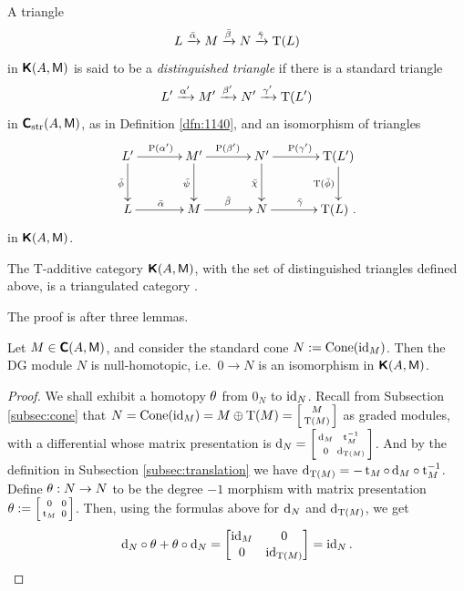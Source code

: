 \begin{dfn} \label{dfn:140}
A triangle 
\[ L \xrightarrow{\bar{\alpha}} M \xrightarrow{\bar{\beta}} N \xrightarrow{\bar{\gamma}} \operatorname{T}(L)  \]
in $\boldsymbol{\mathsf{K}}(A, \operatorname{\mathsf{M}})$ is said to be a {\em distinguished triangle}
if there is a standard triangle 
\[ L' \xrightarrow{\alpha'} M' \xrightarrow{\beta'} N' \xrightarrow{\gamma'} \operatorname{T}(L')  \]
in $\boldsymbol{\mathsf{C}}_{\mathrm{str}}(A, \operatorname{\mathsf{M}})$, as in Definition \ref{dfn:1140},
and an isomorphism of triangles 
\[ \UseTips  \xymatrix @C=8ex @R=6ex { 
L' 
\ar[r]^{\opn{P}(\al')}
\ar[d]_{ \bar{\phi} } 
&
M'
\ar[r]^{\opn{P}(\be')}
\ar[d]_{ \bar{\psi} }
& 
N'
\ar[r]^{\opn{P}(\ga')}
\ar[d]_{ \bar{\chi} }
&
\opn{T}(L')
\ar[d]_{ \opn{T}(\bar{\phi}) }
\\
L 
\ar[r]^{\bar{\al}}
&
M
\ar[r]^{\bar{\be}}
& 
N
\ar[r]^{\bar{\ga}}
&
\opn{T}(L)
\ .
}  \]
in $\boldsymbol{\mathsf{K}}(A, \operatorname{\mathsf{M}})$.
\end{dfn}

\begin{thm} \label{thm:1255}
The T-additive category $\boldsymbol{\mathsf{K}}(A, \operatorname{\mathsf{M}})$, with the set of 
distinguished triangles defined above, is a triangulated category%
%
.
\end{thm}

The proof is after three lemmas. 

\begin{lem}  \label{lem:2}
Let $M \in \boldsymbol{\mathsf{C}}(A, \operatorname{\mathsf{M}})$, and consider the standard cone 
$N := \operatorname{Cone}(\operatorname{id}_M)$. Then the DG module $N$ is null-homotopic, i.e.\ 
$0 \to N$ is an isomorphism in $\boldsymbol{\mathsf{K}}(A, \operatorname{\mathsf{M}})$.
\end{lem}

\begin{proof}
We shall exhibit a homotopy $\theta$ from $0_N$ to $\operatorname{id}_N$. 
Recall from Subsection \ref{subsec:cone} that 
$N = \operatorname{Cone}(\operatorname{id}_M) = M \oplus \operatorname{T}(M) = 
\left[ \begin{smallmatrix}  M \\[0.2em]\operatorname{T}(M)  \end{smallmatrix} \right]$
as graded modules, with a differential whose matrix presentation is
$\mathrm{d}_{N} = \left[ \begin{smallmatrix} \mathrm{d}_M & \operatorname{t}_M^{-1} \\[0.2em] 0 & \mathrm{d}_{\operatorname{T}(M)} \end{smallmatrix} \right]$.
And by the definition in Subsection \ref{subsec:translation} we have
$\mathrm{d}_{\operatorname{T}(M)} = - \operatorname{t}_M \circ \, \mathrm{d}_M \circ \operatorname{t}_M^{-1}$. 
Define 
$\theta : N \to N$ to be the degree $-1$ morphism with  matrix presentation
$\theta :=  \left[ \begin{smallmatrix}  0 & \, 0 \\[0.2em] \operatorname{t}_M & \, 0  \end{smallmatrix} \right]$.
Then, using the formulas above for $\mathrm{d}_N$ and $\mathrm{d}_{\operatorname{T}(M)}$, we get
\[ \mathrm{d}_N \circ \theta + \theta \circ \mathrm{d}_N =  
\begin{bmatrix}  \operatorname{id}_M & 0 \\[0.1em] 0 & \operatorname{id}_{\operatorname{T}(M)}  \end{bmatrix} = \operatorname{id}_N. 
\qedhere \]
\end{proof}

